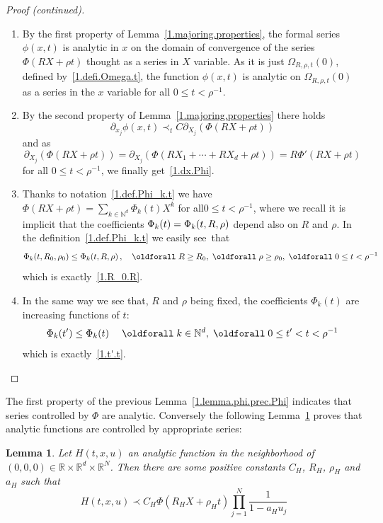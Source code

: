 \documentclass[10pt]{amsart}
\newtheorem{lemm}[cdrthm]{Lemma}
\theoremstyle{definition}
\newenvironment{proofc}{\begin{proof}[Proof (continued)]}{\end{proof}}
\theoremstyle{plain}
\newcommand*\R{{\mathbb R}}
\newcommand*\N{{\mathbb N}}
\newcommand{\dptl}{\partial}%
\newcommand*\dsp{\displaystyle}
\renewcommand*{\forall}{\mathrel{\oldforall}}
\begin{document}
\begin{proofc}
\begin{enumerate}
\item[\eqref{lem4.4.1}] By the first property of Lemma~\ref{1.majoring.properties}, the formal series $\phi(x,t)$ is analytic in $x$ on the domain of convergence of the series $\Phi(RX + \rho t)$ thought as a series in $X$ variable. As it is just $\Omega_{R,\rho,t}(0)$, defined by~\eqref{1.defi.Omega.t}, the function $\phi(x,t)$ is analytic on $\Omega_{R,\rho,t}(0)$ as a series in the $x$ variable for all $0\leq t < \rho^{-1}$.

\item[\eqref{lem4.4.2}] By the second property of Lemma~\ref{1.majoring.properties} there holds
\[
 \dptl_{x_j}\phi(x,t) \prec_{t} C\dptl_{X_j} \left(\Phi(RX+\rho t)\right)
\] 
and as
\[
\dptl_{X_j} \left(\Phi(RX+\rho t)\right) = \dptl_{X_j} \left(\Phi(RX_1 + \cdots + RX_{d} +\rho t)\right) = R\Phi'(RX+\rho t)
\]
for all $0\leq t < \rho^{-1}$, we finally get~\eqref{1.dx.Phi}.

\item[\eqref{lem4.4.3}] Thanks to notation~\eqref{1.def.Phi_k.t} we have $\Phi(RX + \rho t) = \sum_{k\in\N^{d}} \Phi_{k}(t) X^{k} $ for all\linebreak$0 \leq t < \rho^{-1}$, where we recall it is implicit that the coefficients $\Phi_{k}(t)\linebreak= \Phi_{k}(t,R,\rho)$ depend also on $R$ and $\rho$. In the definition~\eqref{1.def.Phi_k.t} we easily see~that
\[
\Phi_{k}(t,R_0,\rho_0) \leq \Phi_{k}(t,R,\rho)\,, \quad \forall R\geq R_0,\; \forall \rho \geq \rho_0,\; \forall 0 \leq t < \rho^{-1}
\]
which is exactly~\eqref{1.R_0.R}.

\item[\eqref{lem4.4.4}] In the same way we see that, $ R$ and $\rho$ being fixed, the coefficients $\Phi_{k}(t)$ are increasing functions of $t$:
\[
\Phi_{k}(t') \leq \Phi_{k}(t) \quad \forall k\in\N^{d}, \; \forall 0 \leq t' < t < \rho^{-1}
\]
which is exactly~\eqref{1.t'.t}.
\end{enumerate}
\end{proofc}

The first property of the previous Lemma~\ref{1.lemma.phi.prec.Phi} indicates that series controlled by $\Phi$ are analytic. Conversely the following Lemma~\ref{1.lemma.H} proves that analytic functions are controlled by appropriate series:

\begin{lemm}\label{1.lemma.H}
Let $H(t,x,u)$ an analytic function in the neighborhood of\linebreak$(0,0,0)\in\R\times\R^{d}\times\R^{N}$. Then there are some positive constants $C_{H}$, $R_H$, $\rho_H$ and $a_H$ such that
\begin{equation}\label{1.prec.H}
H(t,x,u) \prec C_H \Phi(R_H X + \rho_H t) \prod_{j=1}^{N}\frac{\dsp 1}{1 - a_H u_j}
\end{equation}
\end{lemm}
\end{document}
